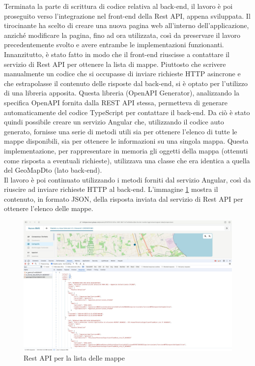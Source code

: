 Terminata la parte di scrittura di codice relativa al back-end, il lavoro è poi proseguito verso l'integrazione nel front-end della Rest API, appena sviluppata. Il tirocinante ha scelto di creare una nuova pagina web all'interno dell'applicazione, anziché modificare la pagina, fino ad ora utilizzata, così da preservare il lavoro precedentemente svolto e avere entrambe le implementazioni funzionanti.
\\Innanzitutto, è stato fatto in modo che il front-end riuscisse a contattare il servizio di Rest API per ottenere la lista di mappe. Piuttosto che scrivere manualmente un codice che si occupasse di inviare richieste HTTP asincrone e che estrapolasse il contenuto delle risposte dal back-end, si è optato per l'utilizzo di una libreria apposita. Questa libreria (OpenAPI Generator), analizzando la specifica OpenAPI fornita dalla REST API stessa, permetteva di generare automaticamente del codice TypeScript per contattare il back-end. Da ciò è stato quindi possibile creare un servizio Angular che, utilizzando il codice auto generato, fornisse una serie di metodi utili sia per ottenere l'elenco di tutte le mappe disponibili, sia per ottenere le informazioni su una singola mappa. Questa implementazione, per rappresentare in memoria gli oggetti della mappa (ottenuti come risposta a eventuali richieste), utilizzava una classe che era identica a quella del GeoMapDto (lato back-end).
\\Il lavoro è poi continuato utilizzando i metodi forniti dal servizio Angular, così da riuscire ad inviare richieste HTTP al back-end. L'immagine \ref{fig:restAPI} mostra il contenuto, in formato JSON, della risposta inviata dal servizio di Rest API per ottenere l'elenco delle mappe. 
\begin{figure}[htbp]
      \centering
      \includegraphics[width=1\textwidth]{Tesi/images/Capitolo7/restAPI.png}
      \caption{Rest API per la lista delle mappe}
      \label{fig:restAPI}
\end{figure}
